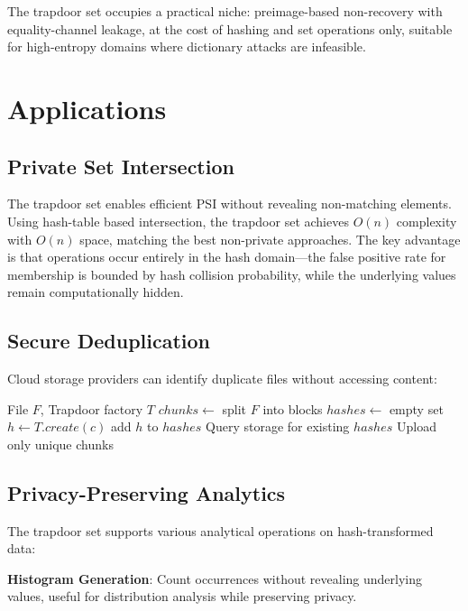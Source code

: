 \documentclass[10pt,conference]{IEEEtran}
\begin{document}
The trapdoor set occupies a practical niche: preimage-based non-recovery with equality-channel leakage, at the cost of hashing and set operations only, suitable for high-entropy domains where dictionary attacks are infeasible.

\section{Applications}
\label{sec:applications}

\subsection{Private Set Intersection}

The trapdoor set enables efficient PSI without revealing non-matching elements. Using hash-table based intersection, the trapdoor set achieves $O(n)$ complexity with $O(n)$ space, matching the best non-private approaches. The key advantage is that operations occur entirely in the hash domain---the false positive rate for membership is bounded by hash collision probability, while the underlying values remain computationally hidden.

\subsection{Secure Deduplication}

Cloud storage providers can identify duplicate files without accessing content:

\begin{algorithm}
\caption{Secure Deduplication}
\begin{algorithmic}[1]
\REQUIRE File $F$, Trapdoor factory $T$
\STATE $chunks \leftarrow$ split $F$ into blocks
\STATE $hashes \leftarrow$ empty set
  \STATE $h \leftarrow T.create(c)$
  \STATE add $h$ to $hashes$
\ENDFOR
\STATE Query storage for existing $hashes$
\STATE Upload only unique chunks
\end{algorithmic}
\end{algorithm}

\subsection{Privacy-Preserving Analytics}

The trapdoor set supports various analytical operations on hash-transformed data:

\textbf{Histogram Generation}: Count occurrences without revealing underlying values, useful for distribution analysis while preserving privacy.
\end{document}
